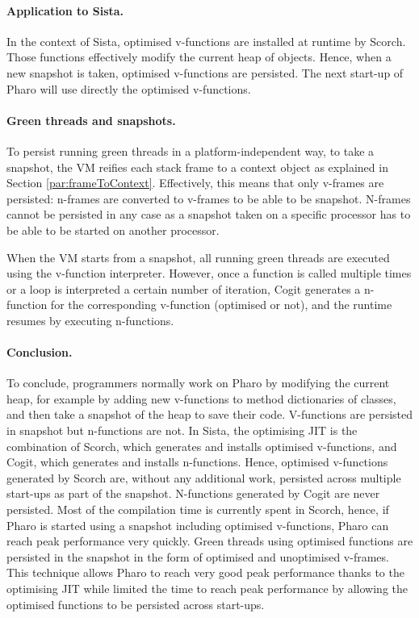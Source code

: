 \documentclass[a4paper,12pt,twoside]{../includes/ThesisStyle}
\begin{document}
\paragraph{Application to Sista.}In the context of Sista, optimised v-functions are installed at runtime by Scorch. Those functions effectively modify the current heap of objects. Hence, when a new snapshot is taken, optimised v-functions are persisted. The next start-up of Pharo will use directly the optimised v-functions.

\paragraph{Green threads and snapshots.}To persist running green threads in a platform-independent way, to take a snapshot, the VM reifies each stack frame to a context object as explained in Section \ref{par:frameToContext}. Effectively, this means that only v-frames are persisted: n-frames are converted to v-frames to be able to be snapshot. N-frames cannot be persisted in any case as a snapshot taken on a specific processor has to be able to be started on another processor.

When the VM starts from a snapshot, all running green threads are executed using the v-function interpreter. However, once a function is called multiple times or a loop is interpreted a certain number of iteration, Cogit generates a n-function for the corresponding v-function (optimised or not), and the runtime resumes by executing n-functions.

\paragraph{Conclusion.}To conclude, programmers normally work on Pharo by modifying the current heap, for example by adding new v-functions to method dictionaries of classes, and then take a snapshot of the heap to save their code. V-functions are persisted in snapshot but n-functions are not. In Sista, the optimising JIT is the combination of Scorch, which generates and installs optimised v-functions, and Cogit, which generates and installs n-functions. Hence, optimised v-functions generated by Scorch are, without any additional work, persisted across multiple start-ups as part of the snapshot. N-functions generated by Cogit are never persisted. Most of the compilation time is currently spent in Scorch, hence, if Pharo is started using a snapshot including optimised v-functions, Pharo can reach peak performance very quickly. Green threads using optimised functions are persisted in the snapshot in the form of optimised and unoptimised v-frames. This technique allows Pharo to reach very good peak performance thanks to the optimising JIT while limited the time to reach peak performance by allowing the optimised functions to be persisted across start-ups.
\end{document}
